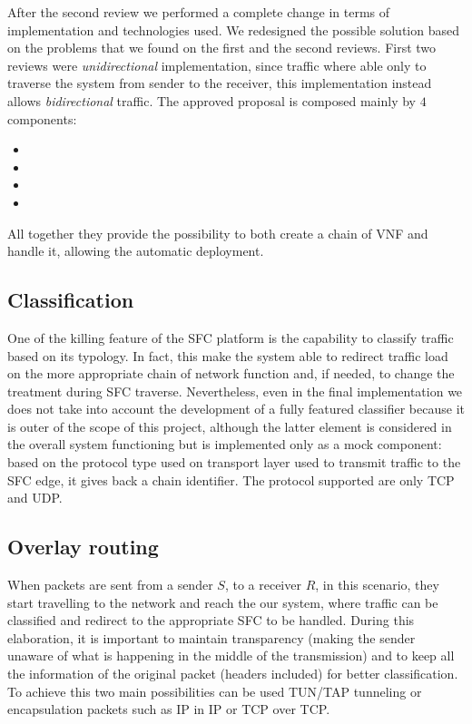After the second review we performed a complete change in terms of
implementation and technologies used. We redesigned the possible solution based
on the problems that we found on the first and the second reviews. First two
reviews were \emph{unidirectional} implementation, since traffic where able
only to traverse the system from sender to the receiver, this implementation
instead allows \emph{bidirectional} traffic. The approved proposal is composed
mainly by $4$ components:
\begin{itemize}
  \item \astaire{}
  \item \harbor{}
  \item \ironhide{}
  \item \roulette{}
\end{itemize}
All together they provide the possibility to both create a chain of VNF and
handle it, allowing the automatic deployment.

\subsection{Classification}
One of the killing feature of the SFC platform is the capability to classify
traffic based on its typology. In fact, this make the system able to redirect
traffic load on the more appropriate chain of network function and, if needed,
to change the treatment during SFC traverse. Nevertheless, even in the final
implementation we does not take into account the development of a fully featured
classifier because it is outer of the scope of this project, although the
latter element is considered in the overall system functioning but is
implemented only as a mock component: based on the protocol type used on
transport layer used to transmit traffic to the SFC edge, it gives back a
chain identifier. The protocol supported are only TCP and UDP.

\subsection{Overlay routing}
When packets are sent from a sender $S$, to a receiver $R$, in this scenario,
they start travelling to the network and reach the our system, where traffic can
be classified and redirect to the appropriate SFC to be handled. During this
elaboration, it is important to maintain transparency (making the sender unaware
of what is happening in the middle of the transmission) and to keep all the
information of the original packet (headers included) for better classification.
To achieve this two main possibilities can be used TUN/TAP tunneling or
encapsulation packets such as IP in IP or TCP over TCP.

